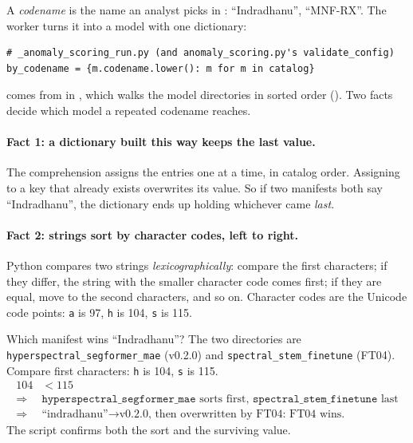 A \emph{codename} is the name an analyst picks in : ``Indradhanu'', ``MNF-RX''. The worker turns
it into a model with one dictionary:

\begin{lstlisting}
# _anomaly_scoring_run.py (and anomaly_scoring.py's validate_config)
by_codename = {m.codename.lower(): m for m in catalog}
\end{lstlisting}

 comes from  in , which walks
the model directories in sorted order (). Two facts decide which model a
repeated codename reaches.

\paragraph{Fact 1: a dictionary built this way keeps the last value.} The comprehension assigns the entries one at a
time, in catalog order. Assigning to a key that already exists overwrites its value. So if two manifests both say
``Indradhanu'', the dictionary ends up holding whichever came \emph{last}.

\paragraph{Fact 2: strings sort by character codes, left to right.} 
Python compares two strings \emph{lexicographically}: compare the first characters; if they differ, the string with
the smaller character code comes first; if they are equal, move to the second characters, and so on. Character codes
are the Unicode code points: \texttt{a} is 97, \texttt{h} is 104, \texttt{s} is 115.

\begin{worked}[label={we:shipping:sort}]{Which manifest wins ``Indradhanu''?}
The two directories are \texttt{hyperspectral\_segformer\_mae} (v0.2.0) and \texttt{spectral\_stem\_finetune} (FT04).
Compare first characters: \texttt{h} is 104, \texttt{s} is 115.
\begin{align*}
104 &< 115\\
\Rightarrow\ &\texttt{hyperspectral\_segformer\_mae} \text{ sorts first, } \texttt{spectral\_stem\_finetune} \text{ last}\\
\Rightarrow\ &\text{``indradhanu''} \to \text{v0.2.0, then overwritten by FT04: FT04 wins.}
\end{align*}
The script confirms both the sort and the surviving value\tagC.
\end{worked}

